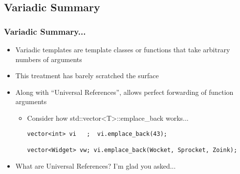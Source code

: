 \subsection{Variadic Summary}
\begin{frame}[fragile,t]
\frametitle{Variadic Summary...}
\begin{itemize}[<+->]
\item Variadic templates are template classes or functions that take
  arbitrary numbers of arguments
\item This treatment has barely scratched the surface
\item Along with ``Universal References'', allows perfect forwarding
  of function arguments
\begin{itemize}
  \item Consider how std::vector<T>::emplace\_back works...
{\scriptsize\begin{verbatim}
vector<int> vi   ;  vi.emplace_back(43);

vector<Widget> vw; vi.emplace_back(Wocket, Sprocket, Zoink);
\end{verbatim}
}
\end{itemize}
\item What are Universal References? I'm glad you asked...
\end{itemize}
\end{frame}



